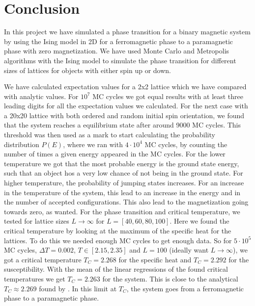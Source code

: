 \documentclass[12pt,a4paper,english]{article}
\begin{document}
\section{Conclusion}
In this project we have simulated a phase transition for a binary magnetic system by using the Ising model in 2D for a ferromagnetic phase to a paramagnetic phase with zero magnetization. We have used Monte Carlo and Metropolis algorithms with the Ising model to simulate the phase transition for different sizes of lattices for objects with either spin up or down.

We have calculated expectation values for a 2x2 lattice which we have compared with analytic values. For $10^7$ MC cycles we got equal results with at least three leading digits for all the expectation values we calculated. For the next case with a 20x20 lattice with both ordered and random initial spin orientation, we found that the system reaches a equilibrium state after around 9000 MC cycles. This threshold was then used as a mark to start calculating the probability distribution $P(E)$, where we ran with $4\cdot10^4$ MC cycles, by counting the number of times a given energy appeared in the MC cycles. For the lower temperature we got that the most probable energy is the ground state energy, such that an object hos a very low chance of not being in the ground state. For higher temperature, the probability of jumping states increases. For an increase in the temperature of the system, this lead to an increase in the energy and in the number of accepted configurations. This also lead to the magnetization going towards zero, as wanted. For the phase transition and critical temperature, we tested for lattice sizes $L\rightarrow\infty$ for $L=[40,60,80,100]$. Here we found the critical temperature by looking at the maximum of the specific heat for the lattices. To do this we needed enough MC cycles to get enough data. So for $5\cdot10^5$ MC cycles, $\Delta T=0.002$, $T\in[2.15,2.35]$ and $L=100$ (ideally want $L\rightarrow\infty$), we got a critical temperature $T_C=2.268$ for the specific heat and $T_C=2.292$ for the susceptibility. With the mean of the linear regressions of the found critical temperatures we get $T_C=2.263$ for the system. This is close to the analytical $T_C\approx2.269$ found by \citet{PhysRev.65.117}. In this limit at $T_C$, the system goes from a ferromagnetic phase to a paramagnetic phase.
\end{document}
